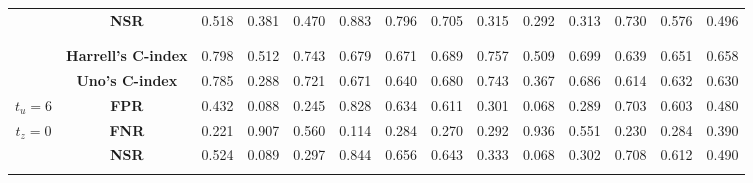 \begin{table}[!htbp]
\begin{tabular}{c|c|cccccc|cccccc}
 & {\bf NSR} & 0.518 & 0.381 & 0.470 & 0.883 & 0.796 & 0.705 & 0.315 & 0.292 & 0.313 & 0.730 & 0.576 & 0.496 \\
& & & & & & & & & & & & & \\
\hline
& & & & & & & & & & & & & \\
 & {\bf Harrell’s C-index} & 0.798 & 0.512 & 0.743 & 0.679 & 0.671 & 0.689 & 0.757 & 0.509 & 0.699 & 0.639 & 0.651 & 0.658 \\
 & {\bf Uno's C-index} & 0.785 & 0.288 & 0.721 & 0.671 & 0.640 & 0.680 & 0.743 & 0.367 & 0.686 & 0.614 & 0.632 & 0.630 \\
$t_u=6$ & {\bf FPR} & 0.432 & 0.088 & 0.245 & 0.828 & 0.634 & 0.611 & 0.301 & 0.068 & 0.289 & 0.703 & 0.603 & 0.480 \\
$t_z=0$ & {\bf FNR} & 0.221 & 0.907 & 0.560 & 0.114 & 0.284 & 0.270 & 0.292 & 0.936 & 0.551 & 0.230 & 0.284 & 0.390 \\
 & {\bf NSR} & 0.524 & 0.089 & 0.297 & 0.844 & 0.656 & 0.643 & 0.333 & 0.068 & 0.302 & 0.708 & 0.612 & 0.490 \\
& & & & & & & & & & & & & \\
\hline
\end{tabular}
\end{table}
